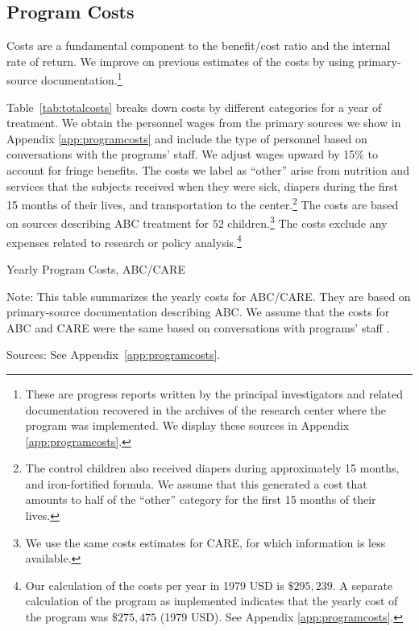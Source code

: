 \subsection{Program Costs} \label{section:programscosts}

Costs are a fundamental component to the benefit/cost ratio and the internal rate of return. We improve on previous estimates of the costs by using primary-source documentation.\footnote{These are progress reports written by the principal investigators and related documentation recovered in the archives of the research center where the program was implemented. We display these sources in Appendix \ref{app:programcosts}.}

Table~\ref{tab:totalcosts} breaks down costs by different categories for a year of treatment. We obtain the personnel wages from the primary sources we show in Appendix \ref{app:programcosts} and include the type of personnel based on conversations with the programs' staff. We adjust wages upward by 15\% to account for fringe benefits. The costs we label as ``other'' arise from nutrition and services that the subjects received when they were sick, diapers during the first 15 months of their lives, and transportation to the center.\footnote{The control children also received diapers during approximately 15 months, and iron-fortified formula. We assume that this generated a cost that amounts to half of the ``other'' category for the first 15 months of their lives.} The costs are based on sources describing ABC treatment for $52$ children.\footnote{We use the same costs estimates for CARE, for which information is less available.} The costs exclude any expenses related to research or policy analysis.\footnote{Our calculation of the costs per year in 1979 USD is $\$295,239$. A separate calculation of the program as implemented indicates that the yearly cost of the program was $\$275,475$ (1979 USD). See Appendix \ref{app:programcosts}.}

\begin{table}[H]
\begin{threeparttable}
\caption{Yearly Program Costs, ABC/CARE} \label{tab:totalcosts}
\footnotesize

\begin{tablenotes}
\footnotesize
\item Note: This table summarizes the yearly costs for ABC/CARE. They are based on primary-source documentation describing ABC. We assume that the costs for ABC and CARE were the same based on conversations with programs' staff \citep{projectcare2014interviews,abc2014-2015interviews}. \\
\item Sources: See Appendix~\ref{app:programcosts}.
\end{tablenotes}
\end{threeparttable}
\end{table}

